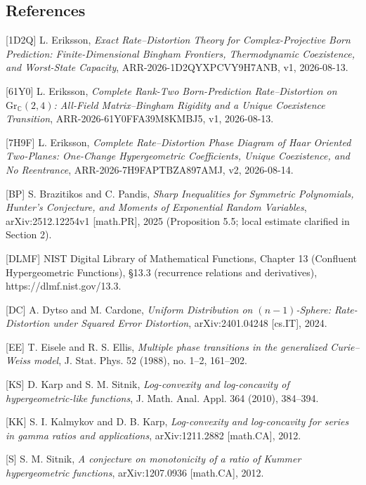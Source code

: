 \documentclass[
  11pt,
  a4paper,
]{article}
\begin{document}
\subsection{References}\label{references}

{[}1D2Q{]} L. Eriksson, \emph{Exact Rate--Distortion Theory for
Complex-Projective Born Prediction: Finite-Dimensional Bingham
Frontiers, Thermodynamic Coexistence, and Worst-State Capacity},
ARR-2026-1D2QYXPCVY9H7ANB, v1, 2026-08-13.

{[}61Y0{]} L. Eriksson, \emph{Complete Rank-Two Born-Prediction
Rate--Distortion on \(\mathrm{Gr}_{\mathbb C}(2,\allowbreak{}4)\): All-Field
Matrix--Bingham Rigidity and a Unique Coexistence Transition},
ARR-2026-61Y0FFA39M8KMBJ5, v1, 2026-08-13.

{[}7H9F{]} L. Eriksson, \emph{Complete Rate--Distortion Phase Diagram of
Haar Oriented Two-Planes: One-Change Hypergeometric Coefficients, Unique
Coexistence, and No Reentrance}, ARR-2026-7H9FAPTBZA897AMJ, v2,
2026-08-14.

{[}BP{]} S. Brazitikos and C. Pandis, \emph{Sharp Inequalities for
Symmetric Polynomials, Hunter's Conjecture, and Moments of Exponential
Random Variables}, arXiv:2512.12254v1 {[}math.PR{]}, 2025 (Proposition
5.5; local estimate clarified in Section 2).

{[}DLMF{]} NIST Digital Library of Mathematical Functions, Chapter 13
(Confluent Hypergeometric Functions), §13.3 (recurrence relations and
derivatives), https://dlmf.nist.gov/13.3.

{[}DC{]} A. Dytso and M. Cardone, \emph{Uniform Distribution on
\((n-1)\)-Sphere: Rate-Distortion under Squared Error Distortion},
arXiv:2401.04248 {[}cs.IT{]}, 2024.

{[}EE{]} T. Eisele and R. S. Ellis, \emph{Multiple phase transitions in
the generalized Curie--Weiss model}, J. Stat. Phys. 52 (1988), no. 1--2,
161--202.

{[}KS{]} D. Karp and S. M. Sitnik, \emph{Log-convexity and log-concavity
of hypergeometric-like functions}, J. Math. Anal. Appl. 364 (2010),
384--394.

{[}KK{]} S. I. Kalmykov and D. B. Karp, \emph{Log-convexity and
log-concavity for series in gamma ratios and applications},
arXiv:1211.2882 {[}math.CA{]}, 2012.

{[}S{]} S. M. Sitnik, \emph{A conjecture on monotonicity of a ratio of
Kummer hypergeometric functions}, arXiv:1207.0936 {[}math.CA{]}, 2012.
\end{document}
